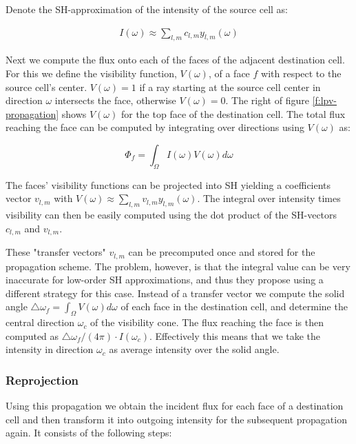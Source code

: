 Denote the SH-approximation of the intensity of the source cell as:

\begin{eqnarray*}
	I(\omega)\approx\sum_{l,m}c_{l,m}y_{l,m}(\omega)
\end{eqnarray*}

Next we compute the flux onto each of the faces of the adjacent destination cell. For this we define the visibility function, $V(\omega)$, of a face $f$ with respect to the source cell's center. $V(\omega)=1$ if a ray starting at the source cell center in direction $\omega$ intersects the face, otherwise $V(\omega)=0$. The right of figure \ref{f:lpv-propagation} shows $V(\omega)$ for the top face of the destination cell. The total flux reaching the face can be computed by integrating over directions using $V(\omega)$ as:

\begin{equation*}
	\Phi_f=\int_\Omega I(\omega)V(\omega)d\omega
\end{equation*}

The faces' visibility functions can be projected into SH yielding a coefficients vector $v_{l,m}$ with $V(\omega)\approx\sum_{l,m}v_{l,m}y_{l,m}(\omega)$. The integral over intensity times visibility can then be easily computed using the dot product of the SH-vectors $c_{l,m}$ and $v_{l,m}$.

These "transfer vectors" $v_{l,m}$ can be precomputed once and stored for the propagation scheme. The problem, however, is that the integral value can be very inaccurate for low-order SH approximations, and thus they propose using a different strategy for this case. Instead of a transfer vector we compute the solid angle $\triangle\omega_f=\int_\Omega V(\omega)d\omega$ of each face in the destination cell, and determine the central direction $\omega_c$ of the visibility cone. The flux reaching the face is then computed as $\triangle\omega_f/(4\pi)\cdot I(\omega_c)$. Effectively this means that we take the intensity in direction $\omega_c$ as average intensity over the solid angle.




\subsubsection{Reprojection}
Using this propagation we obtain the incident flux for each face of a destination cell and then transform it into outgoing intensity for the subsequent propagation again. It consists of the following steps:

